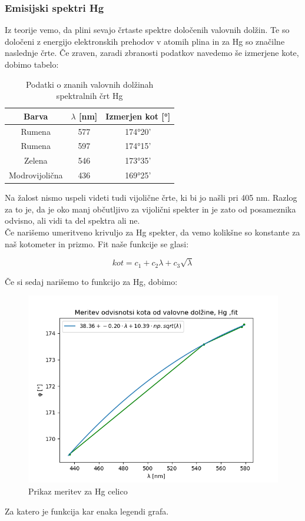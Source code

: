 \documentclass[11pt, a4paper]{article}
\theoremstyle{definition}
\theoremstyle{example}
\theoremstyle{izrek}
\begin{document}
\subsubsection{Emisijski spektri Hg}
Iz teorije vemo, da plini sevajo črtaste spektre določenih valovnih dolžin. Te so določeni z energijo elektronskih prehodov v atomih plina in za Hg so značilne naslednje črte. Če zraven, zaradi zbranosti podatkov navedemo še izmerjene kote, dobimo tabelo:
\begin{table}[H]
	\centering
	\begin{tabular}{|c|c|c|}
		\hline
		Barva &  $\lambda$ [nm] & Izmerjen kot [°] \\
		\hline
		\hline
		Rumena  & 577 & 174°20'\\
		\hline
		Rumena  & 597 & 174°15'\\
		\hline
		Zelena & 546 & 173°35'\\
		\hline
		Modrovijolična & 436 & 169°25' \\  
		\hline
		\hline
	\end{tabular}
	\caption{Podatki o znanih valovnih dolžinah spektralnih črt Hg}	
\end{table}
Na žalost nismo uspeli videti tudi vijolične črte, ki bi jo našli pri 405 nm. Razlog za to je, da je oko manj občutljivo za vijolični spekter in je zato od posameznika odvisno, ali vidi ta del spektra ali ne. \\
\medskip
Če narišemo umeritveno krivuljo za Hg spekter, da vemo kolikšne so konstante za naš kotometer in prizmo. Fit naše funkcije se glasi:

$$kot=c_1+c_2\lambda+c_3 \sqrt{\lambda}$$

Če si sedaj narišemo to funkcijo za Hg, dobimo:

\begin{figure}[H]
    \centering
    \includegraphics[width=12cm]{Hg spekter,fit.png}
    \caption{Prikaz meritev za Hg celico}
\end{figure}
Za katero je funkcija kar enaka legendi grafa.
\end{document}
